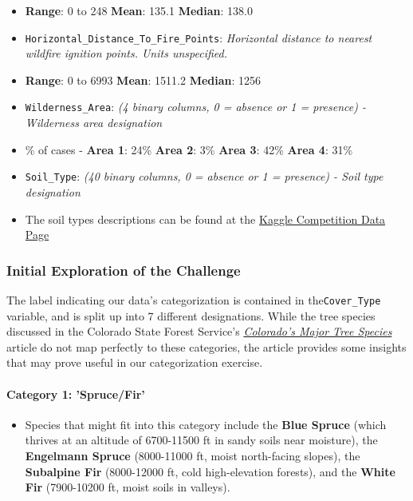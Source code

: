 \documentclass[11pt]{article}
\providecommand{\tightlist}{%
      \setlength{\itemsep}{0pt}\setlength{\parskip}{0pt}}
\begin{document}
\begin{itemize}
{  3pm, summer solstice}
\item
  \textbf{Range}: 0 to 248 \textbar{} \textbf{Mean}: 135.1 \textbar{}
  \textbf{Median}: 138.0
\item
  \texttt{Horizontal\_Distance\_To\_Fire\_Points}: \emph{Horizontal
  distance to nearest wildfire ignition points. Units unspecified.}
\item
  \textbf{Range}: 0 to 6993 \textbar{} \textbf{Mean}: 1511.2 \textbar{}
  \textbf{Median}: 1256
\item
  \texttt{Wilderness\_Area}: \emph{(4 binary columns, 0 = absence or 1 =
  presence) - Wilderness area designation}
\item
  \% of cases - \textbf{Area 1}: 24\% \textbar{}\textbar{} \textbf{Area
  2}: 3\% \textbar{}\textbar{} \textbf{Area 3}: 42\%
  \textbar{}\textbar{} \textbf{Area 4}: 31\%
\item
  \texttt{Soil\_Type}: \emph{(40 binary columns, 0 = absence or 1 =
  presence) - Soil type designation}
\item
  The soil types descriptions can be found at the
  \href{https://www.kaggle.com/c/forest-cover-type-prediction/data}{Kaggle
  Competition Data Page}
\end{itemize}

    \subsubsection{Initial Exploration of the
Challenge}\label{initial-exploration-of-the-challenge}

The label indicating our data's categorization is contained in
the\texttt{Cover\_Type} variable, and is split up into 7 different
designations. While the tree species discussed in the Colorado State
Forest Service's
\href{https://csfs.colostate.edu/colorado-trees/colorados-major-tree-species/}{\emph{Colorado's
Major Tree Species}} article do not map perfectly to these categories,
the article provides some insights that may prove useful in our
categorization exercise.

\paragraph{\texorpdfstring{{Category 1}:
'Spruce/Fir'}{Category 1: 'Spruce/Fir'}}\label{category-1-sprucefir}

\begin{itemize}
\tightlist
\item
  Species that might fit into this category include the \textbf{Blue
  Spruce} (which thrives at an altitude of 6700-11500 ft in sandy soils
  near moisture), the \textbf{Engelmann Spruce} (8000-11000 ft, moist
  north-facing slopes), the \textbf{Subalpine Fir} (8000-12000 ft, cold
  high-elevation forests), and the \textbf{White Fir} (7900-10200 ft,
  moist soils in valleys).
\end{itemize}
\end{document}
